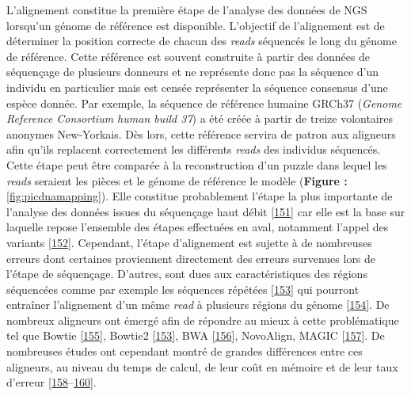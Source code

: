 \documentclass[12pt,a4paper,twoside]{ugathesis}
\theoremstyle{definition}
\theoremstyle{definition}
\theoremstyle{definition}
\theoremstyle{remark}
\begin{document}
L'alignement constitue la première étape de l'analyse des données de NGS
lorsqu'un génome de référence est disponible. L'objectif de l'alignement
est de déterminer la position correcte de chacun des \emph{reads}
séquencés le long du génome de référence. Cette référence est souvent
construite à partir des données de séquençage de plusieurs donneurs et
ne représente donc pas la séquence d'un individu en particulier mais est
censée représenter la séquence consensus d'une espèce donnée. Par
exemple, la séquence de référence humaine GRCh37 (\emph{Genome Reference
Consortium human build 37}) a été créée à partir de treize volontaires
anonymes New-Yorkais. Dès lors, cette référence servira de patron aux
aligneurs afin qu'ils replacent correctement les différents \emph{reads}
des individus séquencés. Cette étape peut être comparée à la
reconstruction d'un puzzle dans lequel les \emph{reads} seraient les
pièces et le génome de référence le modèle (\textbf{Figure :
}\ref{fig:picdnamapping}). Elle constitue probablement l'étape la plus
importante de l'analyse des données issues du séquençage haut débit
{[}\protect\hyperlink{ref-Flicek2009}{151}{]} car elle est la base sur
laquelle repose l'ensemble des étapes effectuées en aval, notamment
l'appel des variants {[}\protect\hyperlink{ref-Nielsen2011}{152}{]}.
Cependant, l'étape d'alignement est sujette à de nombreuses erreurs dont
certaines proviennent directement des erreurs survenues lors de l'étape
de séquençage. D'autres, sont dues aux caractéristiques des régions
séquencées comme par exemple les séquences répétées
{[}\protect\hyperlink{ref-Langmead2012}{153}{]} qui pourront entraîner
l'alignement d'un même \emph{read} à plusieurs régions du génome
{[}\protect\hyperlink{ref-Treangen2013}{154}{]}. De nombreux aligneurs
ont émergé afin de répondre au mieux à cette problématique tel que
Bowtie {[}\protect\hyperlink{ref-Langmead2009}{155}{]}, Bowtie2
{[}\protect\hyperlink{ref-Langmead2012}{153}{]}, BWA
{[}\protect\hyperlink{ref-Li2009a}{156}{]}, NovoAlign, MAGIC
{[}\protect\hyperlink{ref-Su2014}{157}{]}. De nombreuses études ont
cependant montré de grandes différences entre ces aligneurs, au niveau
du temps de calcul, de leur coût en mémoire et de leur taux d'erreur
{[}\protect\hyperlink{ref-Ruffalo2011}{158}--\protect\hyperlink{ref-Bao2011}{160}{]}.

\newpage
\end{document}
